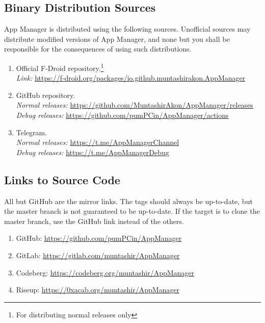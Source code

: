 \subsection{Binary Distribution Sources}\label{subsec:binary-distribution-sources} %
App Manager is distributed using the following sources. Unofficial sources may distribute modified versions of App
Manager, and none but you shall be responsible for the consequences of using such distributions.
\begin{enumerate}
    \item Official F-Droid repository.\footnote{For distributing normal releases only}\\
    \textit{Link:} \url{https://f-droid.org/packages/io.github.muntashirakon.AppManager}
    \item GitHub repository.\\
    \textit{Normal releases:} \url{https://github.com/MuntashirAkon/AppManager/releases}\\
    \textit{Debug releases:} \url{https://github.com/pumPCin/AppManager/actions}
    \item Telegram.\\
    \textit{Normal releases:} \url{https://t.me/AppManagerChannel}\\
    \textit{Debug releases:} \url{https://t.me/AppManagerDebug}
\end{enumerate}

\subsection{Links to Source Code}\label{subsec:links-to-source-code} %
All but GitHub are the mirror links. The tags should always be up-to-date, but the master branch is not guaranteed to be
up-to-date. If the target is to clone the master branch, use the GitHub link instead of the others.
\begin{enumerate}
    \item GitHub: \url{https://github.com/pumPCin/AppManager}
    \item GitLab: \url{https://gitlab.com/muntashir/AppManager}
    \item Codeberg: \url{https://codeberg.org/muntashir/AppManager}
    \item Riseup: \url{https://0xacab.org/muntashir/AppManager}
\end{enumerate}

